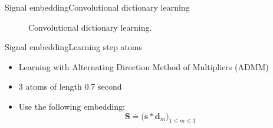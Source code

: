 \documentclass[8pt,t,aspectratio=1610]{beamer}
\newcommand{\ratio}{0.5}
\newcommand{\bfs}{\mathbf{s}}
\newcommand{\bfS}{\mathbf{S}}
\newcommand{\bfd}{\mathbf{d}}
\begin{document}
\begin{frame}{Signal embedding}{Convolutional dictionary learning}
\begin{minipage}[t]{0.4\linewidth}
\begin{figure}[h]
        \caption{Convolutional dictionary learning.}
    \end{figure}
\end{minipage}

\end{frame}

\begin{frame}{Signal embedding}{Learning step atoms}

\renewcommand{\ratio}{0.9}
\centering
\begin{minipage}[t]{0.45\linewidth}
\begin{itemize}
    \item Learning with Alternating Direction Method of Multipliers (ADMM) \cite{bristow2013fast}
        \item 3 atoms of length 0.7 second

    \pause[3]
    \item Use the following embedding:
\begin{equation*}\label{eq: convolutional embedding}
\bfS \doteq \Big( \bfs * \bfd_m\Big)_{1 \le m \le 3 }
\end{equation*}
        
\end{itemize}


\end{minipage}
\end{frame}
\end{document}
